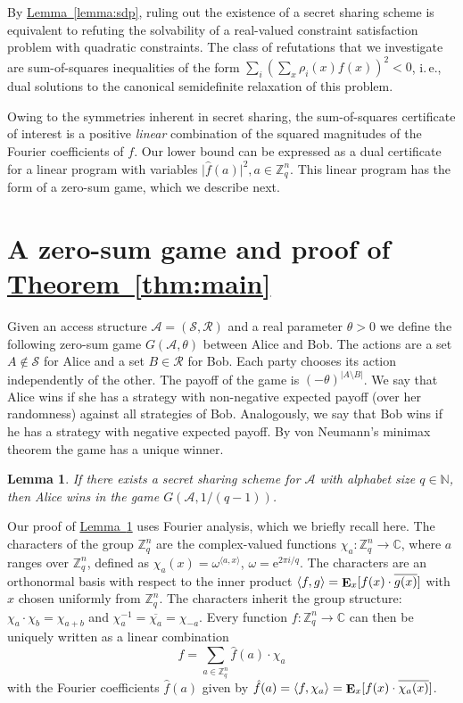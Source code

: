 \documentclass[11pt]{article}
\numberwithin{equation}{section}
\newtheorem{lemma}[theorem]{Lemma}
\theoremstyle{definition}
\theoremstyle{plain}
\newcommand{\Z}{\mathbb Z}
\newcommand{\eee}{\mathrm e}
\newcommand{\ie}{i.\,e.}
\newcommand{\expref}[2]{\hyperref[#2]{#1~\ref{#2}}}
\DeclareMathOperator\E{\mathop{\bf E}}
\def\calA{\mathcal{A}}
\def\calS{\mathcal{S}}
\def\calR{\mathcal{R}}
\providecommand\abs[1]{\lvert#1\rvert}
\providecommand\ip[1]{\langle#1\rangle}
\begin{document}
By \expref{Lemma}{lemma:sdp}, ruling out the existence of a secret sharing scheme is equivalent to refuting the solvability of a real-valued constraint satisfaction problem with quadratic constraints.  
The class of refutations that we investigate are sum-of-squares inequalities of the form $\sum_i (\sum_x \rho_i(x) f(x))^2 < 0$, \ie, 
dual solutions to the canonical semidefinite relaxation of this problem.

Owing to the symmetries inherent in secret sharing, the sum-of-squares certificate of interest is a positive \emph{linear} combination of the squared magnitudes of the Fourier coefficients of $f$.  Our lower bound can be expressed as a dual certificate for a linear program with variables $\abs{\hat{f}(a)}^2, a \in \Z_q^n$.  This linear program has the form of a zero-sum game, which we describe next.


\section{A zero-sum game and proof of \expref{Theorem}{thm:main}}
\label{sec:game}

Given an access structure $\calA = (\calS, \calR)$ and a real parameter
$\theta > 0$ we define the following zero-sum game $G(\calA, \theta)$ between
Alice and Bob. The actions are a set $A \not\in \calS$ for Alice and a set
$B\in \calR$ for Bob.  
Each party chooses its action independently of the other.
The payoff of the game is $(-\theta)^{\abs{A \setminus B}}$.  We say that
Alice wins if she has a strategy with non-negative expected payoff (over her randomness) against all strategies of Bob. Analogously, we say that
Bob wins if he has a strategy with negative expected payoff.  By von Neumann's
minimax theorem the game has a unique winner. 

\begin{lemma}
	\label{lemma:main}
	If there exists a secret sharing scheme for $\calA$ with alphabet size
	$q\in\mathbb{N}$, then Alice wins in the game $G(\calA, 1/(q-1))$.
\end{lemma}

Our proof of \expref{Lemma}{lemma:main} uses Fourier analysis, which we briefly
recall here. The characters of the group $\Z_q^n$ are the complex-valued
functions $\chi_a\colon \Z_q^n \to\mathbb{C}$, where $a$ ranges over $\Z_q^n$,
defined as $\chi_a(x) = \omega^{\ip{a, x}}$, $\omega = \eee^{2\pi i/q}$.  
The
characters are an orthonormal basis with respect to the inner product $\langle
f, g \rangle = \E_{x}[f(x) \cdot \overline{g(x)}]$ with $x$
chosen uniformly from $\Z_q^n$.  The characters inherit the group structure: $\chi_a \cdot \chi_b = \chi_{a+b}$ and $\chi_a^{-1} = \overline{\chi_a} = \chi_{-a}$. Every function $f\colon \Z_q^n \to \mathbb{C}$
can then be uniquely written as a linear combination
\[
  f = \sum_{a \in \Z_q^n}
  \hat{f}(a) \cdot \chi_a
\]
with the Fourier coefficients $\hat{f}(a)$ given by
$\hat{f}(a) = \langle f,\chi_a \rangle = \E_{x}[f(x)\cdot
\overline{\chi_a(x)}]$.
\end{document}
